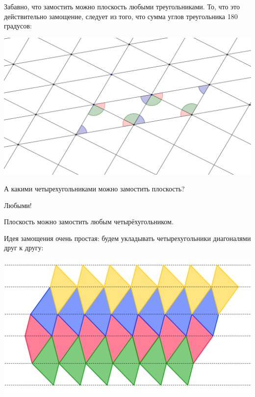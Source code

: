 \documentclass{beamer}
\begin{document}
\begin{frame}
Забавно, что замостить можно плоскость любыми треугольниками. То, что это действительно замощение, следует из того, что сумма углов треугольника 180 градусов:

\begin{center}
\includegraphics[width=\textwidth]{triangle.png}
\end{center}

\end{frame}


\begin{frame}

А какими четырехугольниками можно замостить плоскость?

\bigskip

\pause

Любыми!

\bigskip

\pause

\begin{theorem}
Плоскость можно замостить любым четырёхугольником.
\end{theorem}

\end{frame}

\begin{frame}

Идея замощения очень простая: будем укладывать четырехугольники диагоналями друг к другу:

\begin{center}
\includegraphics[width=\textwidth]{4-1.png}
\end{center}

\end{frame}
\end{document}
